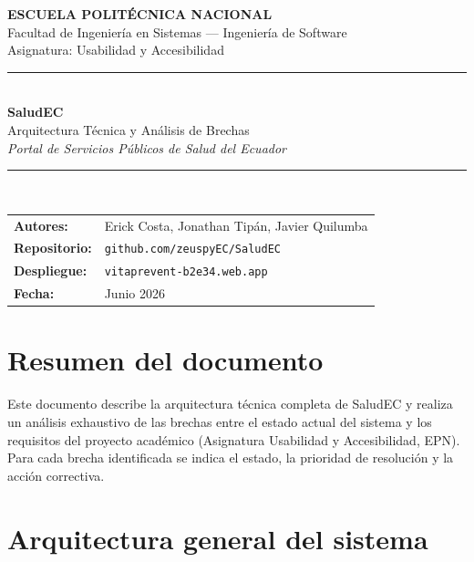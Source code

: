 \documentclass[12pt, a4paper]{article}
\begin{document}
\begin{titlepage}
\centering
\vspace*{2cm}
{\Large\bfseries\color{navydeep} ESCUELA POLITÉCNICA NACIONAL}\\[4pt]
{\normalsize Facultad de Ingeniería en Sistemas --- Ingeniería de Software}\\[4pt]
{\normalsize Asignatura: Usabilidad y Accesibilidad}\\[2cm]
{\color{royalblue}\rule{0.8\linewidth}{1.5pt}}\\[1cm]
{\Huge\bfseries\color{navydeep} SaludEC}\\[0.4cm]
{\Large\color{royalblue} Arquitectura Técnica y Análisis de Brechas}\\[0.3cm]
{\large\itshape Portal de Servicios Públicos de Salud del Ecuador}\\[1cm]
{\color{royalblue}\rule{0.8\linewidth}{0.8pt}}\\[1.5cm]
\begin{tabular}{ll}
  \textbf{Autores:} & Erick Costa, Jonathan Tipán, Javier Quilumba \\
  \textbf{Repositorio:} & \texttt{github.com/zeuspyEC/SaludEC} \\
  \textbf{Despliegue:} & \texttt{vitaprevent-b2e34.web.app} \\
  \textbf{Fecha:} & Junio 2026 \\
\end{tabular}
\end{titlepage}

\tableofcontents
\newpage

\section{Resumen del documento}

Este documento describe la arquitectura técnica completa de SaludEC y realiza un análisis exhaustivo de las brechas entre el estado actual del sistema y los requisitos del proyecto académico (Asignatura Usabilidad y Accesibilidad, EPN). Para cada brecha identificada se indica el estado, la prioridad de resolución y la acción correctiva.

\section{Arquitectura general del sistema}
\end{document}
